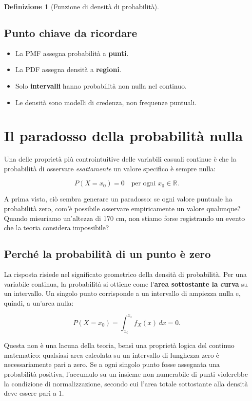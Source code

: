 \documentclass[
  italian,
  letterpaper,
  a4paper,
  11pt,
  open=any]{scrbook}
\providecommand{\tightlist}{%
  \setlength{\itemsep}{0pt}\setlength{\parskip}{0pt}}
\theoremstyle{plain}
\theoremstyle{definition}
\theoremstyle{definition}
\newtheorem{definition}{Definizione}[chapter]
\theoremstyle{remark}
\begin{document}
\begin{definition}[Funzione di densità di
probabilità]
\subsection{Punto chiave da ricordare}\label{punto-chiave-da-ricordare}

\begin{itemize}
\tightlist
\item
  La PMF assegna probabilità a \textbf{punti}.
\item
  La PDF assegna densità a \textbf{regioni}.
\item
  Solo \textbf{intervalli} hanno probabilità non nulla nel continuo.
\item
  Le densità sono modelli di credenza, non frequenze puntuali.
\end{itemize}

\section{Il paradosso della probabilità
nulla}\label{il-paradosso-della-probabilituxe0-nulla}

Una delle proprietà più controintuitive delle variabili casuali continue
è che la probabilità di osservare \emph{esattamente} un valore specifico
è sempre nulla:

\[
P(X = x_0) = 0 \quad \text{per ogni } x_0 \in \mathbb{R}.
\]

A prima vista, ciò sembra generare un paradosso: se ogni valore puntuale
ha probabilità zero, com'è possibile osservare empiricamente un valore
qualunque? Quando misuriamo un'altezza di 170 cm, non stiamo forse
registrando un evento che la teoria considera impossibile?

\subsection{Perché la probabilità di un punto è
zero}\label{perchuxe9-la-probabilituxe0-di-un-punto-uxe8-zero}

La risposta risiede nel significato geometrico della densità di
probabilità. Per una variabile continua, la probabilità si ottiene come
l'\textbf{area sottostante la curva} su un intervallo. Un singolo punto
corrisponde a un intervallo di ampiezza nulla e, quindi, a un'area
nulla:

\[
P(X = x_0) = \int_{x_0}^{x_0} f_X(x) \, dx = 0.
\]

Questa non è una lacuna della teoria, bensì una proprietà logica del
continuo matematico: qualsiasi area calcolata su un intervallo di
lunghezza zero è necessariamente pari a zero. Se a ogni singolo punto
fosse assegnata una probabilità positiva, l'accumulo su un insieme non
numerabile di punti violerebbe la condizione di normalizzazione, secondo
cui l'area totale sottostante alla densità deve essere pari a 1.


\end{definition}
\end{document}
